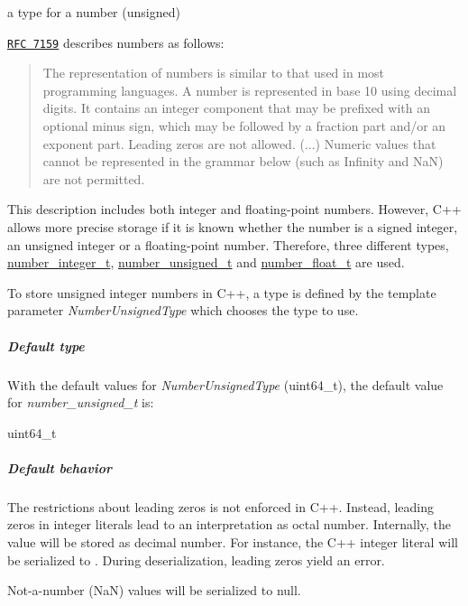 a type for a number (unsigned) 

\href{http://rfc7159.net/rfc7159}{\tt R\+FC 7159} describes numbers as follows\+: \begin{quote}
The representation of numbers is similar to that used in most programming languages. A number is represented in base 10 using decimal digits. It contains an integer component that may be prefixed with an optional minus sign, which may be followed by a fraction part and/or an exponent part. Leading zeros are not allowed. (...) Numeric values that cannot be represented in the grammar below (such as Infinity and NaN) are not permitted. \end{quote}


This description includes both integer and floating-\/point numbers. However, C++ allows more precise storage if it is known whether the number is a signed integer, an unsigned integer or a floating-\/point number. Therefore, three different types, \hyperlink{classnlohmann_1_1basic__json_a98e611d67b7bd75307de99c9358ab2dc}{number\+\_\+integer\+\_\+t}, \hyperlink{classnlohmann_1_1basic__json_ab906e29b5d83ac162e823ada2156b989}{number\+\_\+unsigned\+\_\+t} and \hyperlink{classnlohmann_1_1basic__json_a88d6103cb3620410b35200ee8e313d97}{number\+\_\+float\+\_\+t} are used.

To store unsigned integer numbers in C++, a type is defined by the template parameter {\itshape Number\+Unsigned\+Type} which chooses the type to use.

\subparagraph*{Default type}

With the default values for {\itshape Number\+Unsigned\+Type} ({\ttfamily uint64\+\_\+t}), the default value for {\itshape number\+\_\+unsigned\+\_\+t} is\+:


\begin{DoxyCode}
uint64\_t
\end{DoxyCode}


\subparagraph*{Default behavior}


\begin{DoxyItemize}
\item The restrictions about leading zeros is not enforced in C++. Instead, leading zeros in integer literals lead to an interpretation as octal number. Internally, the value will be stored as decimal number. For instance, the C++ integer literal {} will be serialized to {}. During deserialization, leading zeros yield an error.
\item Not-\/a-\/number (NaN) values will be serialized to {\ttfamily null}.
\end{DoxyItemize}

